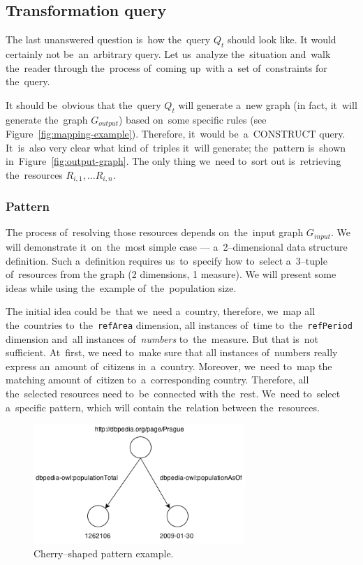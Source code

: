 \subsection{Transformation query}

The last unanswered question is~how the~query $Q_t$ should look like. 
It would certainly not be~an~arbitrary query. Let us~analyze the~situation and~walk the~reader through the~process of~coming up~with a~set of~constraints for the~query.

It should be~obvious that the~query $Q_t$ will generate a~new graph
(in fact, it~will generate the~graph $G_{output}$) based on~some specific rules
(see Figure~\ref{fig:mapping-example}). 
Therefore, it~would be~a~CONSTRUCT query. It~is~also very clear what kind of~triples it~will generate; the~pattern is~shown in~Figure~\ref{fig:output-graph}.
The only thing we~need to~sort out is~retrieving the~resources $R_{i,1}, ... R_{i,n}$.

\subsubsection{Pattern}
\label{sec:pattern-definition}
The process of~resolving those resources depends on~the~input graph $G_{input}$.
We will demonstrate it~on~the~most simple case --- a~2--dimensional data structure 
definition. Such a~definition requires us~to~specify how to~select a~3--tuple of~resources from 
the graph (2 dimensions, 1 measure).
We will present some ideas while using the~example of~the~population size.

The initial idea could be~that we~need a~country, therefore, we~map all the~countries to~the~\texttt{refArea} dimension, all instances of~time to~the~\texttt{refPeriod} 
dimension and~all instances of~\emph{numbers} to~the~measure. But that is~not sufficient. At~first,
we need to~make sure that all instances of~numbers 
really express an~amount of~citizens in~a~country. Moreover, we~need to~map the
matching amount of~citizen to~a~corresponding country. Therefore, all the~selected resources need to~be~connected with the~rest. We~need to~select a~specific pattern, which will contain the~relation between the~resources.

\begin{figure}
	\centering
	\includegraphics[width=80mm]{images/cherry.png}
	\caption{Cherry--shaped pattern example.}
	\label{fig:cherry}
\end{figure}

